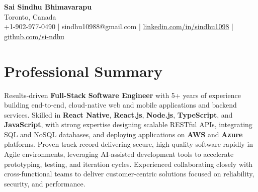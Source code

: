 \documentclass[letterpaper,11pt]{article}
\begin{document}
\begin{center}
  {\Large \textbf{Sai Sindhu Bhimavarapu}} \\
  Toronto, Canada \\
  +1-902-977-0490 \enspace | \enspace sindhu10988@gmail.com \enspace | \enspace \href{https://www.linkedin.com/in/sindhu1098/}{linkedin.com/in/sindhu1098} \enspace | \enspace \href{https://github.com/si-ndhu}{github.com/si-ndhu}
\end{center}

\section{Professional Summary}
  \begin{itemize}[leftmargin=0.15in, label={}]
    \small{\item{
     Results-driven \textbf{Full-Stack Software Engineer} with 5+ years of experience building end-to-end, cloud-native web and mobile applications and backend services. Skilled in \textbf{React Native}, \textbf{React.js}, \textbf{Node.js}, \textbf{TypeScript}, and \textbf{JavaScript}, with strong expertise designing scalable RESTful APIs, integrating SQL and NoSQL databases, and deploying applications on \textbf{AWS} and \textbf{Azure} platforms. Proven track record delivering secure, high-quality software rapidly in Agile environments, leveraging AI-assisted development tools to accelerate prototyping, testing, and iteration cycles. Experienced collaborating closely with cross-functional teams to deliver customer-centric solutions focused on reliability, security, and performance.
    }}
  \end{itemize}
\vspace{-16pt}

\end{document}
